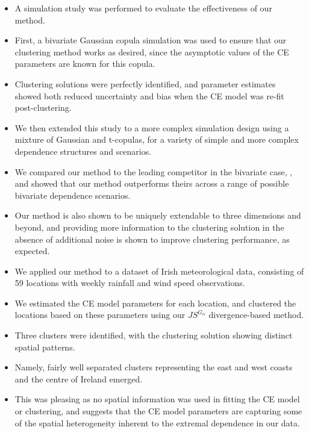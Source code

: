 \documentclass{article}
\numberwithin{equation}{section}
\begin{document}
\vspace{1cm}

\begin{itemize}
  \item A simulation study was performed to evaluate the effectiveness of our method.
  \item First, a bivariate Gaussian copula simulation was used to ensure that our clustering method works as desired, since the asymptotic values of the CE parameters are known for this copula.
  \item Clustering solutions were perfectly identified, and parameter estimates showed both reduced uncertainty and bias when the CE model was re-fit post-clustering. 
  \item We then extended this study to a more complex simulation design using a mixture of Gaussian and t-copulas, for a variety of simple and more complex dependence structures and scenarios.
  \item We compared our method to the leading competitor in the bivariate case, \citet{Vignotto2021}, and showed that our method outperforms theirs across a range of possible bivariate dependence scenarios. 
  \item Our method is also shown to be uniquely extendable to three dimensions and beyond, and providing more information to the clustering solution in the absence of additional noise is shown to improve clustering performance, as expected.
\end{itemize}

\vspace{1cm}

\begin{itemize}
  \item We applied our method to a dataset of Irish meteorological data, consisting of 59 locations with weekly rainfall and wind speed observations.
  \item We estimated the CE model parameters for each location, and clustered the locations based on these parameters using our $JS^{G_{\alpha}}$ divergence-based method. 
  \item Three clusters were identified, with the clustering solution showing distinct spatial patterns.
  \item Namely, fairly well separated clusters representing the east and west coasts and the centre of Ireland emerged.
  \item This was pleasing as no spatial information was used in fitting the CE model or clustering, and suggests that the CE model parameters are capturing some of the spatial heterogeneity inherent to the extremal dependence in our data. 
\end{itemize}
\end{document}
